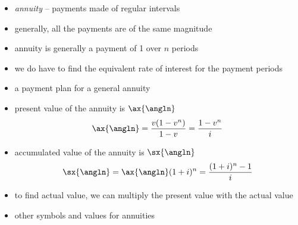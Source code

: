 \documentclass[../00_main.tex]{subfiles}
\begin{document}
\begin{itemize}
    \item \textit{annuity} -- payments made of regular intervals
    \item generally, all the payments are of the same magnitude
    \item annuity is generally a payment of 1 over $n$ periods
    \item we do have to find the equivalent rate of interest for the payment
        periods
    \item a payment plan for a general annuity
        \begin{center}
        \end{center}
    \item present value of the annuity is $\ax{\angln}$
        \begin{equation}\nonumber
            \ax{\angln} = \frac{v(1-v^n)}{1-v} = \frac{1-v^n}{i}
        \end{equation}
    \item accumulated value of the annuity is $\sx{\angln}$
        \begin{equation}\nonumber
            \sx{\angln} = \ax{\angln}(1+i)^n = \frac{(1+i)^n-1}{i}
        \end{equation}
    \item to find actual value, we can multiply the present value with the
        actual value
    \item other symbols and values for annuities
        \begin{center}
        \begin{tikzpicture}

\end{tikzpicture}
\end{center}
\end{itemize}
\end{document}
